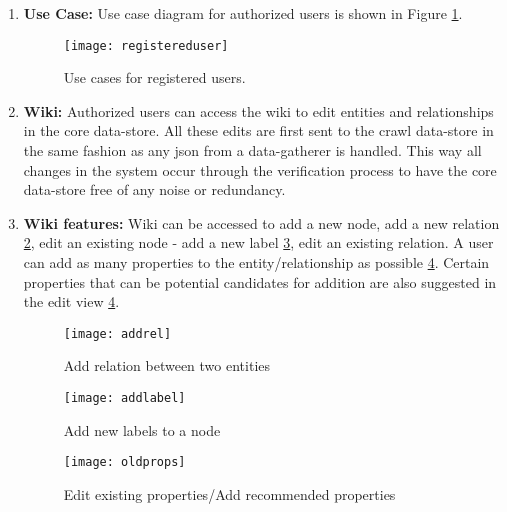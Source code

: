 \begin{enumerate}

\item \textbf{Use Case:} Use case diagram for authorized users is shown in Figure \ref{fig:registereduser}.

\begin{figure}[H]
\begin{center}  
\texttt{[image: registereduser]} 
\caption{Use cases for registered users.}
\label{fig:registereduser}
\end{center}
\end{figure}

\item \textbf{Wiki:} Authorized users can access the wiki to edit entities and relationships in the core data-store. All these edits are first sent to the crawl data-store in the same fashion as any json from a data-gatherer is handled. This way all changes in the system occur through the verification process to have the core data-store free of any noise or redundancy. 


\item \textbf{Wiki features:} Wiki can be accessed to add a new node, add a  new relation \ref{fig:addrel},  edit an existing node  - add a new label \ref{fig:addlabel}, edit an existing relation. A user can add as many properties to the entity/relationship as possible \ref{fig:oldprops}. Certain properties that can be potential candidates for addition are also suggested in the edit view \ref{fig:oldprops}. 

\begin{figure}[H]
\begin{center}  
\texttt{[image: addrel]} 
\caption{Add relation between two entities}
\label{fig:addrel}
\end{center}
\end{figure}


\begin{figure}[H]
\begin{center}  
\texttt{[image: addlabel]} 
\caption{Add new labels to a node}
\label{fig:addlabel}
\end{center}
\end{figure}

\begin{figure}[H]
\begin{center}  
\texttt{[image: oldprops]} 
\caption{Edit existing properties/Add recommended properties}
\label{fig:oldprops}
\end{center}
\end{figure}



\end{enumerate}


